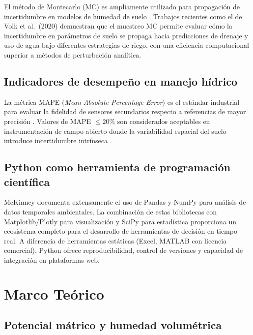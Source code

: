 \documentclass[12pt,a4paper]{article}
\begin{document}
El método de Montecarlo (MC) es ampliamente utilizado para propagación de incertidumbre en modelos de humedad de suelo \cite{kroese2014}. Trabajos recientes como el de Volk et al.\ (2020) \cite{volk2020} demuestran que el muestreo MC permite evaluar cómo la incertidumbre en parámetros de suelo se propaga hacia predicciones de drenaje y uso de agua bajo diferentes estrategias de riego, con una eficiencia computacional superior a métodos de perturbación analítica.

\subsection{Indicadores de desempeño en manejo hídrico}

La métrica MAPE (\textit{Mean Absolute Percentage Error}) es el estándar industrial para evaluar la fidelidad de sensores secundarios respecto a referencias de mayor precisión \cite{mape_ref}. Valores de MAPE $\leq 20\%$ son considerados aceptables en instrumentación de campo abierto donde la variabilidad espacial del suelo introduce incertidumbre intrínseca \cite{jackisch2020}.

\subsection{Python como herramienta de programación científica}

McKinney \cite{mckinney2017} documenta extensamente el uso de Pandas y NumPy para análisis de datos temporales ambientales. La combinación de estas bibliotecas con Matplotlib/Plotly para visualización y SciPy para estadística proporciona un ecosistema completo para el desarrollo de herramientas de decisión en tiempo real. A diferencia de herramientas estáticas (Excel, MATLAB con licencia comercial), Python ofrece reproducibilidad, control de versiones y capacidad de integración en plataformas web.

\section{Marco Teórico}

\subsection{Potencial mátrico y humedad volumétrica}
\end{document}
